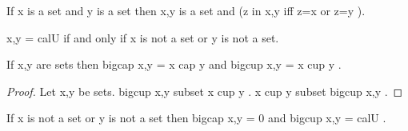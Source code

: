 \documentclass[a4paper,draft]{amsproc}
\begin{document}
\begin{forthel}
\begin{theorem}
If  x  is a set and  y  is a set 
then  {x,y}  is a set and  (z in {x,y}  iff  z=x  or  z=y ). 
\end{theorem}

\begin{theorem}
 {x,y} = cal{U}  if and only if  x  is not a set or  y  is not a set.
\end{theorem}

\begin{theorem}
If  x,y  are sets then  bigcap {x,y} = x cap y 
and  bigcup {x,y} = x cup y .
\end{theorem}
\begin{proof}
Let  x,y  be sets.
 bigcup {x,y} subset x cup y .
 x cup y subset bigcup {x,y} .
\end{proof}

\begin{theorem}
If  x  is not a set or  y  is not a set then
 bigcap {x,y} = 0  and  bigcup {x,y} = cal{U} .
\end{theorem}
\end{forthel}
\end{document}
